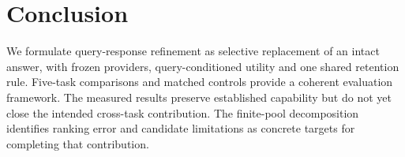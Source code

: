 \section{Conclusion}
We formulate query-response refinement as selective replacement of an intact
answer, with frozen providers, query-conditioned utility and one shared
retention rule. Five-task comparisons and matched controls provide a coherent
evaluation framework. The measured results preserve established capability but
do not yet close the intended cross-task contribution. The finite-pool
decomposition identifies ranking error and candidate limitations as concrete
targets for completing that contribution.
